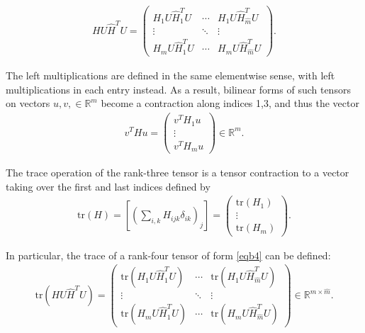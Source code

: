 \documentclass[article,ij4uq]{ij4uq}              %
\begin{document}
\begin{align}
    HU\hat{H}^{T}U=\begin{pmatrix}H_{1}U\hat{H}_{1}^{T}U & \cdots & H_{1}U\hat{H}_{\hat{m}}^{T}U\\\vdots & \ddots & \vdots\\H_{m}U\hat{H}_{1}^{T}U & \cdots & H_{m}U\hat{H}_{\hat{m}}^{T}U\end{pmatrix}.\label{eqb4}
\end{align}
\par The left multiplications are defined in the same elementwise sense, with left multiplications in each entry instead. As a result, bilinear forms of such tensors on vectors $u,v, \in \mathbb{R}^m$ become a contraction along indices 1,3, and thus the vector
\begin{align}
v^THu=\begin{pmatrix}v^TH_{1}u\\ \vdots\\v^T H_{m}u\end{pmatrix} \in \mathbb{R}^m. \label{eqb5}
\end{align}
\par The trace operation of the rank-three tensor is a tensor contraction to a vector taking over the first and last indices defined by
\begin{align}
    \mathrm{tr}(H)=[(\sum_{i,k}H_{ijk}\delta_{ik})_{j}]=\begin{pmatrix}\mathrm{tr}(H_{1})\\ \vdots\\\mathrm{tr}(H_{m})\end{pmatrix}.\label{eqb6}
\end{align}
\par In particular, the trace of a rank-four tensor of form \eqref{eqb4} can be defined:
\begin{align}
    \mathrm{tr}(HU\hat{H}^{T}U)=\begin{pmatrix}\mathrm{tr}(H_{1}U\hat{H}_{1}^{T}U) & \cdots & \mathrm{tr}(H_{1}U\hat{H}_{\hat{m}}^{T}U)\\\vdots & \ddots & \vdots\\\mathrm{tr}(H_{m}U\hat{H}_{1}^{T}U) & \cdots & \mathrm{tr}(H_{m}U\hat{H}_{\hat{m}}^{T}U)\end{pmatrix}\in\mathbb{R}^{m\times \hat{m}}.\label{eqb7}
\end{align}
\end{document}
